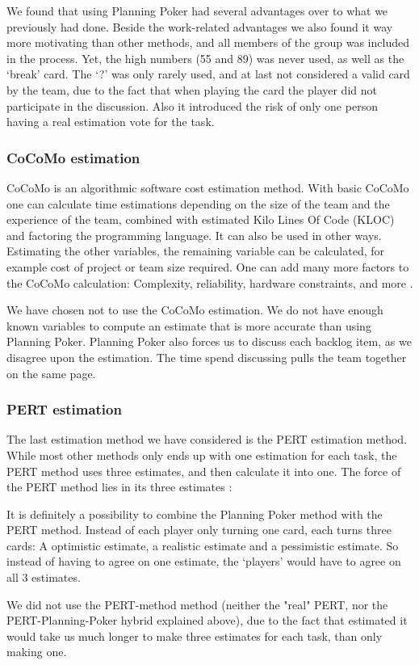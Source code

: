 We found that using Planning Poker had several advantages over to what we previously had done. Beside the work-related advantages we also found it way more motivating than other methods, and all members of the group was included in the process. Yet, the high numbers (55 and 89) was never used, as well as the `break' card. The `?' was only rarely used, and at last not considered a valid card by the team, due to the fact that when playing the card the player did not participate in the discussion. Also it introduced the risk of only one person having a real estimation vote for the task.

\subsubsection{CoCoMo estimation}
CoCoMo is an algorithmic software cost estimation method. With basic CoCoMo one can calculate time estimations depending on the size of the team and the experience of the team, combined with estimated Kilo Lines Of Code (KLOC) and factoring the programming language. It can also be used in other ways. Estimating the other variables, the remaining variable can be calculated, for example cost of project or team size required. One can add many more factors to the CoCoMo calculation: Complexity, reliability, hardware constraints, and more \cite[p. 147]{PM}.

We have chosen not to use the CoCoMo estimation. We do not have enough known variables to compute an estimate that is more accurate than using Planning Poker. Planning Poker also forces us to discuss each backlog item, as we disagree upon the estimation. The time spend discussing pulls the team together on the same page. 

\subsubsection{PERT estimation}
The last estimation method we have considered is the PERT estimation method. While most other methods only ends up with one estimation for each task, the PERT method uses three estimates, and then calculate it into one. The force of the PERT method lies in its three estimates \cite[p. 152]{PM}:

It is definitely a possibility to combine the Planning Poker method with the PERT method. Instead of each player only turning one card, each turns three cards: A optimistic estimate, a realistic estimate and a pessimistic estimate. So instead of having to agree on one estimate, the `players' would have to agree on all 3 estimates.

We did not use the PERT-method method (neither the "real" PERT, nor the PERT-Planning-Poker hybrid explained above), due to the fact that estimated it would take us much longer to make three estimates for each task, than only making one.